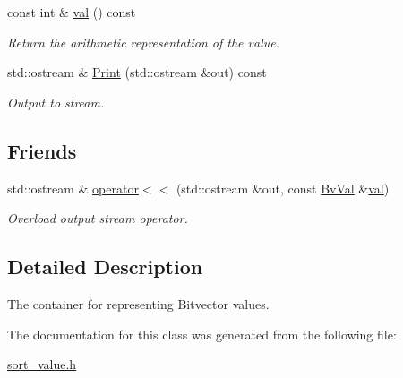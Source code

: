 \begin{DoxyCompactItemize}
const int \& \mbox{\hyperlink{classilang_1_1_bv_val_a1e1171385bcead2c457560938ce0fe35}{val}} () const
\begin{DoxyCompactList}\small\item\em Return the arithmetic representation of the value. \end{DoxyCompactList}\item 
\mbox{\label{classilang_1_1_bv_val_ad12216b96cb0492a13faa5e8d43bd3a9}} 
std\+::ostream \& \mbox{\hyperlink{classilang_1_1_bv_val_ad12216b96cb0492a13faa5e8d43bd3a9}{Print}} (std\+::ostream \&out) const
\begin{DoxyCompactList}\small\item\em Output to stream. \end{DoxyCompactList}\end{DoxyCompactItemize}
\subsection*{Friends}
\begin{DoxyCompactItemize}
\item 
\mbox{\label{classilang_1_1_bv_val_a4e089692a37b19a33b1f9a9041e22792}} 
std\+::ostream \& \mbox{\hyperlink{classilang_1_1_bv_val_a4e089692a37b19a33b1f9a9041e22792}{operator$<$$<$}} (std\+::ostream \&out, const \mbox{\hyperlink{classilang_1_1_bv_val}{Bv\+Val}} \&\mbox{\hyperlink{classilang_1_1_bv_val_a1e1171385bcead2c457560938ce0fe35}{val}})
\begin{DoxyCompactList}\small\item\em Overload output stream operator. \end{DoxyCompactList}\end{DoxyCompactItemize}


\subsection{Detailed Description}
The container for representing Bitvector values. 

The documentation for this class was generated from the following file\+:\begin{DoxyCompactItemize}
\item 
\mbox{\hyperlink{sort__value_8h}{sort\+\_\+value.\+h}}\end{DoxyCompactItemize}
